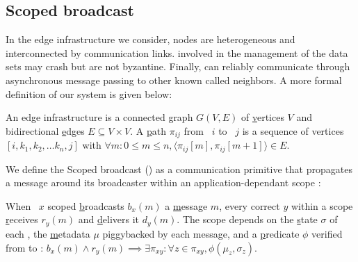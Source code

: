 \subsection{Scoped broadcast}
\label{subsec:scoped}

%

In the edge infrastructure we consider, nodes are heterogeneous and
interconnected by communication links. \Processes involved in the
management of the data sets may crash but are not byzantine.  Finally,
\processes can reliably communicate through asynchronous message
passing to other known \processes called neighbors.
A more formal definition of our system is given below:

\begin{definition}
  An edge infrastructure is a connected \underline{g}raph $G(V, E)$ of
  \underline{v}ertices $V$ and bidirectional \underline{e}dges $E
  \subseteq V \times V$.  A \underline{p}ath $\pi_{ij}$ from
  \Process~$i$ to \Process~$j$ is a sequence of vertices $[i, k_1,
    k_2, \ldots k_n, j]$ with $\forall m: 0\leq m \leq n, \langle
  \pi_{ij}[m], \pi_{ij}[m+1] \rangle \in E$.
\end{definition}


%

We define the Scoped broadcast (\NAMEB) as a communication primitive that propagates a
message around its broadcaster within an application-dependant scope :


\begin{definition}
  When \Process~$x$ scoped \underline{b}roadcasts $b_x(m)$ a
  \underline{m}essage $m$, every correct \process $y$ within a scope
  \underline{r}eceives $r_y(m)$ and \underline{d}elivers it
  $d_y(m)$. The scope depends on the \underline{s}tate $\sigma$ of
  each \process, the \underline{m}etadata $\mu$ piggybacked by each
  message, and a \underline{p}redicate $\phi$ verified from \process to
  \process: {\small{$b_x(m) \wedge r_y(m) \implies \exists \pi_{xy}: \forall z
  \in \pi_{xy}, \phi(\mu_z, \sigma_z)$}}.
\end{definition}

